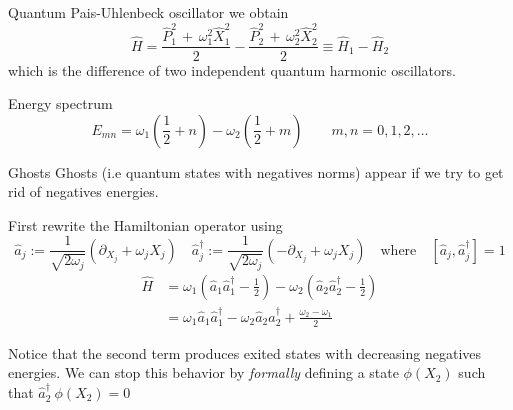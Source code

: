 \begin{frame}{Quantum Pais-Uhlenbeck oscillator}
  we obtain
  \begin{equation*}
    \hat{H} =
    \frac{\hat{P}_1^2 \, + \, \omega_1^2 \hat{X}_1^2}{2} -
    \frac{\hat{P}_2^2 \, + \, \omega_2^2 \hat{X}_2^2}{2} \equiv
    \hat{H}_1 - \hat{H}_2
  \end{equation*}
  which is the difference of two independent quantum harmonic oscillators.
  \vspace{1.5em}
  \begin{block}{Energy spectrum}
    \begin{equation*}
      E_{mn} =
      \omega_1 \left( \frac{1}{2} + n \right) -
      \omega_2 \left( \frac{1}{2} + m \right)
      \qquad m,n = 0,1,2,\ldots
    \end{equation*}
  \end{block}
\end{frame}

\begin{frame}{Ghosts}
  Ghosts (i.e quantum states with negatives norms) appear if we try to get rid
  of negatives energies.

  First rewrite the Hamiltonian operator using
  \begin{equation*}
    \hat{a}_j := \frac{1}{\sqrt{2\omega_j}}
      \left(\partial_{X_j} + \omega_j X_j\right) \quad
    \hat{a}_j^{\dagger} := \frac{1}{\sqrt{2\omega_j}}
      \left(-\partial_{X_j} + \omega_j X_j\right)
    \quad \text{where} \quad
    \left[ \hat{a}_j, \hat{a}_j^{\dagger} \right] = 1
  \end{equation*}
  \begin{align*}
    \hat{H} &=
      \omega_1 \left( \hat{a}_1 \hat{a}_1^{\dagger} - \frac{1}{2} \right) -
      \omega_2 \left( \hat{a}_2 \hat{a}_2^{\dagger} - \frac{1}{2} \right) \\
            &=
      \omega_1 \hat{a}_1 \hat{a}_1^{\dagger} -
      \omega_2 \hat{a}_2 \hat{a}_2^{\dagger} +
      \frac{\omega_2 - \omega_1}{2}
  \end{align*}

  Notice that the second term produces exited states with decreasing negatives
  energies. We can stop this behavior by \emph{formally} defining a state
  $\phi(X_2)$ such that $\hat{a}_2^{\dagger} \ \phi(X_2) = 0$
\end{frame}

